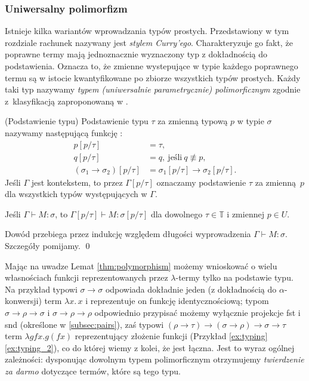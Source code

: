 \subsubsection{Uniwersalny polimorfizm}\label{subsec:polymorphism}
Istnieje kilka wariantów wprowadzania typów prostych. Przedstawiony w tym rozdziale rachunek nazywany jest \emph{stylem Curry'ego}. Charakteryzuje go fakt, że poprawne termy mają jednoznacznie wyznaczony typ z dokładnością do podstawienia. Oznacza to, że zmienne wystepujące w typie każdego poprawnego termu są w istocie kwantyfikowane po zbiorze wszystkich typów prostych. Każdy taki typ nazywamy \emph{typem (uniwersalnie parametrycznie) polimorficznym} zgodnie z~klasyfikacją zaproponowaną w \cite{Cardelli1985}.

\begin{definicja}(Podstawienie typu)
Podstawienie typu \(\tau\) za zmienną typową \(p\) w typie \(\sigma\) nazywamy następującą funkcję :
\begin{align*}
  p[p/ \tau] &=\tau,\\
  q[p/ \tau] &=q,\ \text{jeśli}\ q\not\equiv p,\\
  (\sigma_1 \to \sigma_2) [p/\tau] &= \sigma_1 [p/\tau] \to \sigma_2 [p/\tau].
\end{align*}
  Jeśli \(\Gamma\) jest kontekstem, to przez \(\Gamma[p/\tau]\) oznaczamy podstawienie \(\tau\) za zmienną \(p\) dla wszystkich typów występujących w \(\Gamma\).
\end{definicja}

\begin{lemat}\label{thm:polymorphism}
  Jeśli \(\Gamma\vdash M:\sigma\), to \(\Gamma [p/\tau]\vdash M:\sigma[p/\tau]\) dla dowolnego \(\tau\in\mathbb{T}\) i zmiennej \(p\in U\).
\end{lemat}
\begin{dowod}
  Dowód przebiega przez indukcję względem długości wyprowadzenia \(\Gamma\vdash M:\sigma\). Szczegóły pomijamy. \qed
\end{dowod}

Mając na uwadze Lemat \ref{thm:polymorphism} możemy wnioskować o wielu własnościach funkcji reprezentowanych przez \(\lambda\)-termy tylko na podstawie typu. Na przykład typowi \(\sigma\to\sigma\) odpowiada dokładnie jeden (z dokładnością do \(\alpha\)-konwersji) term \(\lambda x.\,x\) i reprezentuje on funkcję identycznościową; typom \(\sigma\to\rho\to\sigma\) i \(\sigma\to\rho\to\rho\) odpowiednio przypisać możemy wyłącznie projekcje fst i snd (określone w \ref{subsec:pairs}), zaś typowi \((\rho\to\tau) \to (\sigma\to\rho)\to\sigma\to\tau\) term \(\lambda g f x. g (f x)\) reprezentujący złożenie funkcji (Przykład \ref{ex:typing} \ref{ex:typing_2}), co do której wiemy z kolei, że jest łączna.
Jest to wyraz ogólnej zależności: dysponując dowolnym typem polimorficznym otrzymujemy \emph{twierdzenie za darmo} \cite{Wadler1989} dotyczące termów, które są tego typu. 

